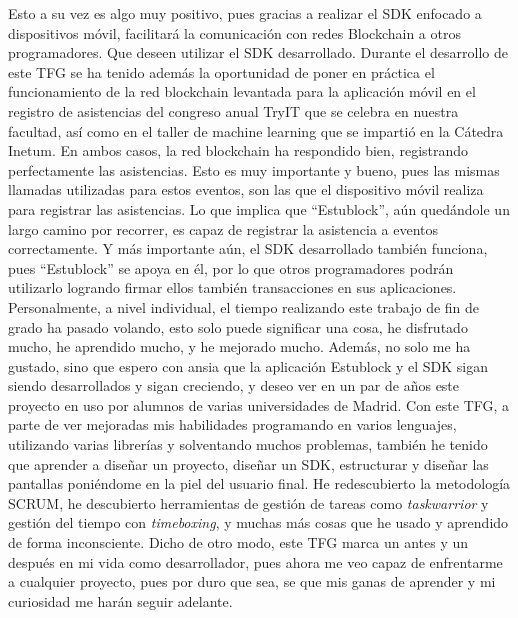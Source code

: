 Esto a su vez es algo muy positivo, pues gracias a realizar el SDK enfocado a dispositivos móvil, facilitará la comunicación con redes Blockchain a otros programadores. Que deseen utilizar el SDK desarrollado. Durante el desarrollo de este TFG se ha tenido además la oportunidad de poner en práctica el funcionamiento de la red blockchain levantada para la aplicación móvil en el registro de asistencias del congreso anual TryIT que se celebra en nuestra facultad, así como en el taller de machine learning que se impartió en la Cátedra Inetum. En ambos casos, la red blockchain ha respondido bien, registrando perfectamente las asistencias. Esto es muy importante y bueno, pues las mismas llamadas utilizadas para estos eventos, son las que el dispositivo móvil realiza para registrar las asistencias. Lo que implica que ``Estublock'', aún quedándole un largo camino por recorrer, es capaz de registrar la asistencia a eventos correctamente. Y más importante aún, el SDK desarrollado también funciona, pues ``Estublock'' se apoya en él, por lo que otros programadores podrán utilizarlo logrando firmar ellos también transacciones en sus aplicaciones. \\

Personalmente, a nivel individual, el tiempo realizando este trabajo de fin de grado ha pasado volando, esto solo puede significar una cosa, he disfrutado mucho, he aprendido mucho, y he mejorado mucho. Además, no solo me ha gustado, sino que espero con ansia que la aplicación Estublock y el SDK sigan siendo desarrollados y sigan creciendo, y deseo ver en un par de años este proyecto en uso por alumnos de varias universidades de Madrid. Con este TFG, a parte de ver mejoradas mis habilidades programando en varios lenguajes, utilizando varias librerías y solventando muchos problemas, también he tenido que aprender a diseñar un proyecto, diseñar un SDK, estructurar y diseñar las pantallas poniéndome en la piel del usuario final. He redescubierto la metodología SCRUM, he descubierto herramientas de gestión de tareas como \textit{taskwarrior} y gestión del tiempo con \textit{timeboxing}, y muchas más cosas que he usado y aprendido de forma inconsciente. Dicho de otro modo, este TFG marca un antes y un después en mi vida como desarrollador, pues ahora me veo capaz de enfrentarme a cualquier proyecto, pues por duro que sea, se que mis ganas de aprender y mi curiosidad me harán seguir adelante. 

